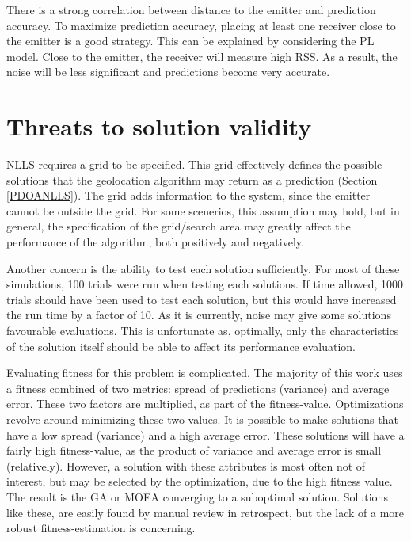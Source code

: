 \documentclass[10pt,a4paper]{book}
\begin{document}
There is a strong correlation between distance to the emitter and prediction accuracy. To maximize prediction accuracy, placing at least one receiver close to the emitter is a good strategy. This can be explained by considering the \gls{PL} model. Close to the emitter, the receiver will measure high \gls{RSS}. As a result, the noise will be less significant and predictions become very accurate.



\newpage

\section{Threats to solution validity}


\gls{NLLS} requires a grid to be specified. This grid effectively defines the possible solutions that the geolocation algorithm may return as a prediction (Section \ref{PDOANLLS}). The grid adds information to the system, since the emitter cannot be outside the grid. For some scenerios, this assumption may hold, but in general, the specification of the grid/search area may greatly affect the performance of the algorithm, both positively and negatively.

Another concern is the ability to test each solution sufficiently. For most of these simulations, 100 trials were run when testing each solutions. If time allowed, 1000 trials should have been used to test each solution, but this would have increased the run time by a factor of 10. As it is currently, noise may give some solutions favourable evaluations. This is unfortunate as, optimally, only the characteristics of the solution itself should be able to affect its performance evaluation.

Evaluating fitness for this problem is complicated. The majority of this work uses a fitness combined of two metrics: spread of predictions (variance) and average error. These two factors are multiplied, as part of the fitness-value. Optimizations revolve around minimizing these two values. It is possible to make solutions that have a low spread (variance) and a high average error. These solutions will have a fairly high fitness-value, as the product of variance and average error is small (relatively). However, a solution with these attributes is most often not of interest, but may be selected by the optimization, due to the high fitness value. The result is the \gls{GA} or \gls{MOEA} converging to a suboptimal solution. Solutions like these, are easily found by manual review in retrospect, but the lack of a more robust fitness-estimation is concerning.
\end{document}
